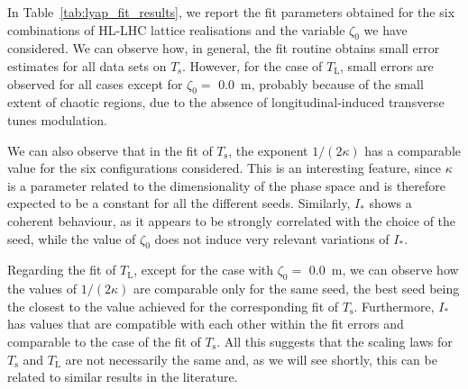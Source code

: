 In Table~\ref{tab:lyap_fit_results}, we report the fit parameters obtained for the six combinations of HL-LHC lattice realisations and the variable $\zeta_0$ we have considered. We can observe how, in general, the fit routine obtains small error estimates for all data sets on $T_\mathrm{s}$. However, for the case of $T_\mathrm{L}$, small errors are observed for all cases except for $\zeta_0 =$ \SI{0.0}{\metre}, probably because of the small extent of chaotic regions, due to the absence of longitudinal-induced transverse tunes modulation.

We can also observe that in the fit of $T_\mathrm{s}$, the exponent $1/(2\kappa)$ has a comparable value for the six configurations considered. This is an interesting feature, since $\kappa$ is a parameter related to the dimensionality of the phase space and is therefore expected to be a constant for all the different seeds. Similarly, $I_\ast$ shows a coherent behaviour, as it appears to be strongly correlated with the choice of the seed, while the value of $\zeta_0$ does not induce very relevant variations of $I_\ast$.

Regarding the fit of $T_\mathrm{L}$, except for the case with $\zeta_0 =$ \SI{0.0}{\metre}, we can observe how the values of $1/(2\kappa)$ are comparable only for the same seed, the best seed being the closest to the value achieved for the corresponding fit of $T_\mathrm{s}$. Furthermore, $I_\ast$ has values that are compatible with each other within the fit errors and comparable to the case of the fit of $T_\mathrm{s}$. All this suggests that the scaling laws for $T_\mathrm{s}$ and $T_\mathrm{L}$ are not necessarily the same and, as we will see shortly, this can be related to similar results in the literature. 

